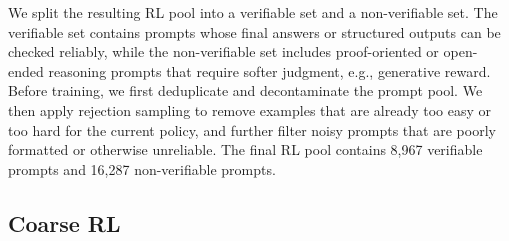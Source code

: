 \documentclass{llmxive}
\begin{document}
We split the resulting RL pool into a verifiable set and a non-verifiable set.
The verifiable set contains prompts whose final answers or structured outputs
can be checked reliably, while the non-verifiable set includes proof-oriented
or open-ended reasoning prompts that require softer judgment, e.g., generative reward. 
Before training,
we first deduplicate and decontaminate the prompt pool. We then apply rejection
sampling to remove examples that are already too easy or too hard for the
current policy, and further filter noisy prompts that are poorly formatted or otherwise unreliable. The final RL pool
contains 8,967 verifiable prompts and 16,287 non-verifiable prompts.


\subsection{Coarse RL}
\label{sec:coarse-rl}
\end{document}
